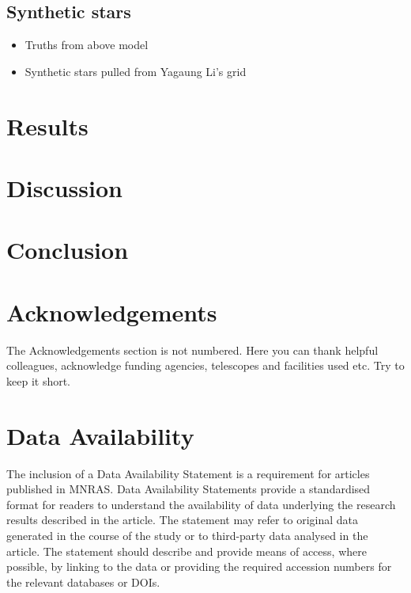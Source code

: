 \documentclass[fleqn,usenatbib]{mnras}
\begin{document}
\subsection{Synthetic stars}
\label{sec:synth}

\begin{itemize}
    \item Truths from above model
    \item Synthetic stars pulled from Yagaung Li's grid
\end{itemize}


\section{Results}
\label{sec:results}

\section{Discussion}
\label{sec:discussion}

\section{Conclusion}
\label{sec:conclusion}

\section*{Acknowledgements}

The Acknowledgements section is not numbered. Here you can thank helpful
colleagues, acknowledge funding agencies, telescopes and facilities used etc.
Try to keep it short.

\section*{Data Availability}
 
The inclusion of a Data Availability Statement is a requirement for articles published in MNRAS. Data Availability Statements provide a standardised format for readers to understand the availability of data underlying the research results described in the article. The statement may refer to original data generated in the course of the study or to third-party data analysed in the article. The statement should describe and provide means of access, where possible, by linking to the data or providing the required accession numbers for the relevant databases or DOIs.
\end{document}
